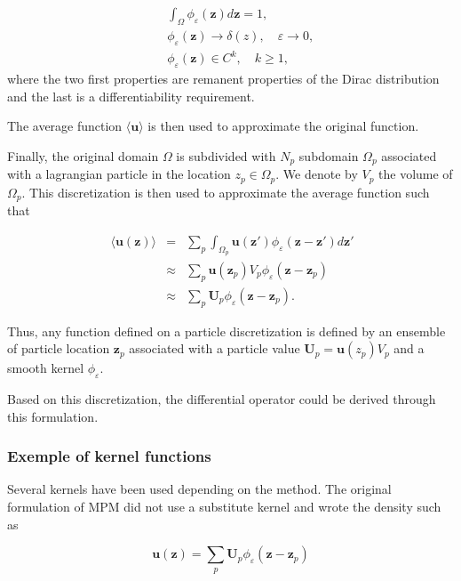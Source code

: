 \begin{eqnarray*}
	&& \int_{\Omega} \phi_\varepsilon(\bm z) d\bm z = 1,      \\
	&& \phi_\varepsilon(\bm z) \to \delta(z), \quad \varepsilon \to 0, \\
	&& \phi_\varepsilon(\bm z) \in C^k,  \quad k \geq 1,
\end{eqnarray*} where the two first properties are remanent properties of the Dirac distribution and the last is a differentiability requirement.

The average function $\langle \bm u \rangle$ is then used to approximate the original function.

Finally, the original domain $\Omega$ is subdivided with $N_p$ subdomain $\Omega_p$ associated with a lagrangian particle in the location $z_p \in \Omega_p$. We denote by $V_p$ the volume of $\Omega_p$. This discretization is then used to approximate the average function such that


\begin{eqnarray*}~\label{part_approx}
	\langle \bm u(\bm z) \rangle &=& \sum_p \int_{\Omega_p} \bm u(\bm z') \phi_\varepsilon(\bm z-\bm z') d\bm z' \\
	&\approx& \sum_p \bm u(\bm z_p) V_p \phi_\varepsilon (\bm z-\bm z_p) \\
	&\approx& \sum_p \bm U_p \phi_\varepsilon (\bm z-\bm z_p).
\end{eqnarray*}

Thus, any function defined on a particle discretization is defined by an ensemble of particle location $\bm z_p$ associated with a particle value $\bm U_p = \bm u(z_p) V_p$ and a smooth kernel $\phi_\varepsilon$.



Based on this discretization, the differential operator could be derived through this formulation.

\subsubsection{Exemple of kernel functions}

Several kernels have been used depending on the method. The original formulation of MPM did not use a substitute kernel and wrote the density such as

\begin{equation*}
	\bm u(\bm z) = \sum_p \bm U_p \phi_\varepsilon (\bm z-\bm z_p)
\end{equation*}

